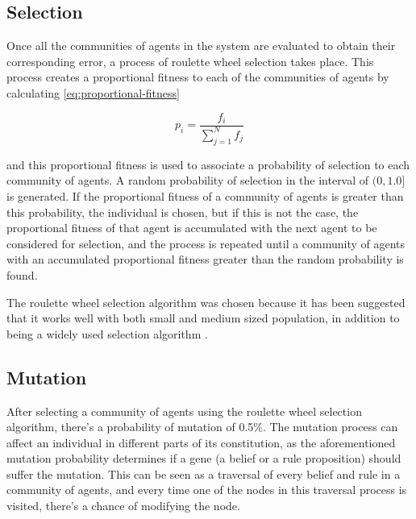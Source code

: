 \subsection{Selection}
\label{subsection:selection}

Once all the communities of agents in the system are evaluated to obtain their
corresponding error, a process of roulette wheel selection takes place. This
process creates a proportional fitness to each of the communities of agents by
calculating \ref{eq:proportional-fitness}

\begin{equation}
  \label{eq:proportional-fitness}
  p_i = \frac{f_i}{\sum_{j=1}^{N} f_j}
\end{equation}

and this proportional fitness is used to associate a probability of selection to
each community of agents. A random probability of selection in the interval of
$(0, 1.0]$ is generated. If the proportional fitness of a community of agents is
greater than this probability, the individual is chosen, but if this is not the
case, the proportional fitness of that agent is accumulated with the next agent
to be considered for selection, and the process is repeated until a community of
agents with an accumulated proportional fitness greater than the random
probability is found.

The roulette wheel selection algorithm was chosen because it has been suggested
that it works well with both small and medium sized population, in addition to
being a widely used selection algorithm \cite{Hancock2012}
\cite{JinghuiZhong2006}. %


\subsection{Mutation}
\label{subsection:mutation}

After selecting a community of agents using the roulette wheel selection
algorithm, there's a probability of mutation of 0.5\%. The mutation process can
affect an individual in different parts of its constitution, as the
aforementioned mutation probability determines if a gene (a belief or a rule
proposition) should suffer the mutation. This can be seen as a traversal of
every belief and rule in a community of agents, and every time one of the nodes
in this traversal process is visited, there's a chance of modifying the node.

